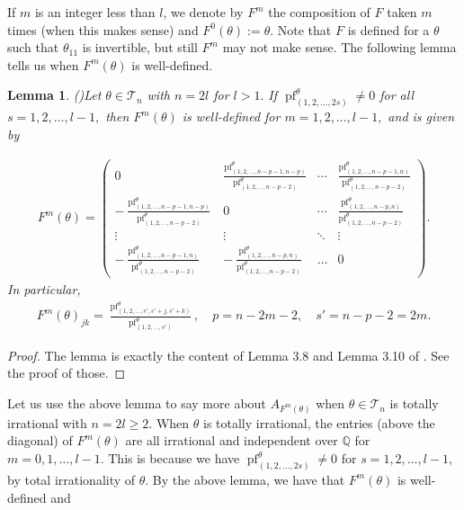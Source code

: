 \documentclass[9pt, BCOR=2mm]{amsart}
\numberwithin{equation}{section}
\numberwithin{equation}{section}
\newtheorem{lemma}[theorem]{Lemma}
\newcommand{\pf}{{\operatorname{pf}}}
\begin{document}
If $m$ is an integer less than $l$, we denote by $F^m$ the composition of $F$ taken $m$ times (when this makes sense) and $F^0(\theta):=\theta.$
Note that $F$ is defined for a $\theta$ such that $\theta_{11}$ is invertible, but still $F^m$ may not make sense. The following lemma tells us  when $F^m(\theta)$ is well-defined.
\begin{lemma}(\cite[Lemma 3.8, Lemma 3.10]{CH21})\label{h1}
   Let $\theta\in \mathcal{T}_n$ with $n=2l$ for $l>1.$ If ${\pf}^{\theta}_{(1,2,\dots,2s)}\neq 0$ for all $s=1,2,\dots,l-1,$ then
   $F^m(\theta)$ is well-defined for $m=1,2,\dots,l-1,$ and is given by
 
  \begin{eqnarray}\label{F^ii}
  F^m(\theta)=\left(
  \begin{array}{cccc}
  0&\frac{{\pf}^{\theta}_{(1,2,\dots,n-p-1,n-p)}}{{\pf}^{\theta}_{(1,2,\dots,n-p-2)}}&\cdots&\frac{{\pf}^{\theta}_{(1,2,\dots,n-p-1,n)}}{{\pf}^{\theta}_{(1,2,\dots,n-p-2)}}\\
  -\frac{{\pf}^{\theta}_{(1,2,\dots,n-p-1,n-p)}}{{\pf}^{\theta}_{(1,2,\dots,n-p-2)}}&0&\cdots& \frac{{\pf}^{\theta}_{(1,2,\dots,n-p,n)}}{{\pf}^{\theta}_{(1,2,\dots,n-p-2)}}\\
  \vdots&\vdots&\ddots&\vdots\\
  -\frac{{\pf}^{\theta}_{(1,2,\dots,n-p-1,n)}}{{\pf}^{\theta}_{(1,2,\dots,n-p-2)}}&
  -\frac{{\pf}^{\theta}_{(1,2,\dots,n-p,n)}}{{\pf}^{\theta}_{(1,2,\dots,n-p-2)}}&
  \ldots&0
  \end{array}\right).
  \end{eqnarray}
  In particular,
  \begin{eqnarray}\label{g1}
  F^m(\theta)_{jk}=\frac{{\pf}^{\theta}_{(1,2,\dots,s',s'+j,s'+k)}}{{\pf}^{\theta}_{(1,2,\dots,s')}},\quad p=n-2m-2,\quad s'=n-p-2=2m.
  \end{eqnarray}
  
\end{lemma}
\begin{proof}
The lemma is exactly the content of Lemma 3.8 and Lemma 3.10 of \cite{CH21}. See the proof of those.
\end{proof}

Let us use the above lemma to say more about $A_{F^{m}(\theta)}$ when $\theta\in\mathcal{T}_n$
is totally irrational with $n=2l\geq2$. When
$\theta$ is totally irrational,  the entries (above the diagonal) of $F^m(\theta)$ are all irrational and independent over $\mathbb{Q}$ for $m=0,1,\dots,l-1.$  
This is because we have ${\pf}^{\theta}_{(1,2,\dots,2s)}\neq 0$ for $s=1,2,\dots,l-1,$ by total irrationality of $\theta$. By the above lemma, we have that $ F^m(\theta)$ is well-defined and
\end{document}
